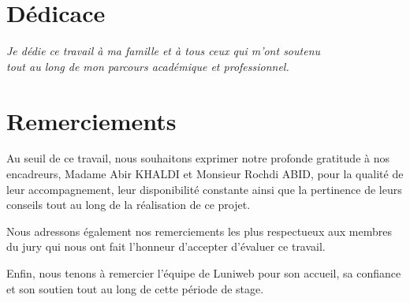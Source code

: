 \documentclass[12pt,a4paper]{report}
\numberwithin{figure}{chapter}
\numberwithin{table}{chapter}
\begin{document}
\chapter*{Dédicace}

\begin{center}
  \textit{\large
    Je dédie ce travail à ma famille et à tous ceux qui m'ont soutenu\\[0.5cm]
    tout au long de mon parcours académique et professionnel.
  }
\end{center}

\vspace{3cm}

\chapter*{Remerciements}

\begin{itshape}
  Au seuil de ce travail, nous souhaitons exprimer notre profonde gratitude à nos encadreurs,
  Madame Abir KHALDI et Monsieur Rochdi ABID, pour la qualité de leur accompagnement, leur
  disponibilité constante ainsi que la pertinence de leurs conseils tout au long de la réalisation
  de ce projet.

  Nous adressons également nos remerciements les plus respectueux aux membres du jury qui nous ont
  fait l'honneur d'accepter d'évaluer ce travail.

  Enfin, nous tenons à remercier l'équipe de Luniweb pour son accueil, sa confiance et son soutien
  tout au long de cette période de stage.
\end{itshape}

\newpage
\tableofcontents

\newpage
\listoffigures

\newpage
\listoftables

\end{document}
